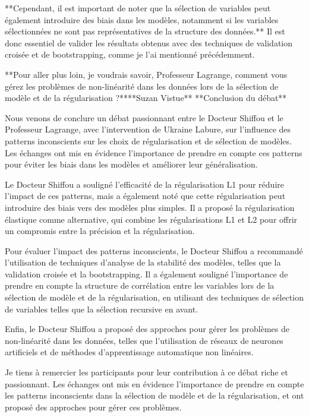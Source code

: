 **Cependant, il est important de noter que la sélection de variables peut également introduire des biais dans les modèles, notamment si les variables sélectionnées ne sont pas représentatives de la structure des données.** Il est donc essentiel de valider les résultats obtenus avec des techniques de validation croisée et de bootstrapping, comme je l'ai mentionné précédemment.

**Pour aller plus loin, je voudrais savoir, Professeur Lagrange, comment vous gérez les problèmes de non-linéarité dans les données lors de la sélection de modèle et de la régularisation ?****Suzan Vistue**
**Conclusion du débat**

Nous venons de conclure un débat passionnant entre le Docteur Shiffou et le Professeur Lagrange, avec l'intervention de Ukraine Labure, sur l'influence des patterns inconscients sur les choix de régularisation et de sélection de modèles. Les échanges ont mis en évidence l'importance de prendre en compte ces patterns pour éviter les biais dans les modèles et améliorer leur généralisation.

Le Docteur Shiffou a souligné l'efficacité de la régularisation L1 pour réduire l'impact de ces patterns, mais a également noté que cette régularisation peut introduire des biais vers des modèles plus simples. Il a proposé la régularisation élastique comme alternative, qui combine les régularisations L1 et L2 pour offrir un compromis entre la précision et la régularisation.

Pour évaluer l'impact des patterns inconscients, le Docteur Shiffou a recommandé l'utilisation de techniques d'analyse de la stabilité des modèles, telles que la validation croisée et la bootstrapping. Il a également souligné l'importance de prendre en compte la structure de corrélation entre les variables lors de la sélection de modèle et de la régularisation, en utilisant des techniques de sélection de variables telles que la sélection recursive en avant.

Enfin, le Docteur Shiffou a proposé des approches pour gérer les problèmes de non-linéarité dans les données, telles que l'utilisation de réseaux de neurones artificiels et de méthodes d'apprentissage automatique non linéaires.

Je tiens à remercier les participants pour leur contribution à ce débat riche et passionnant. Les échanges ont mis en évidence l'importance de prendre en compte les patterns inconscients dans la sélection de modèle et de la régularisation, et ont proposé des approches pour gérer ces problèmes.


